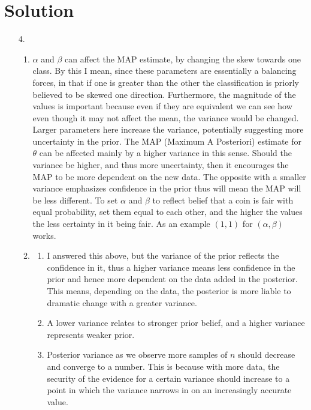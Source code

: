\documentclass[submit]{harvardml}
\newenvironment{answer}
  {\section*{Solution}}
{}
\begin{document}
\begin{answer}
\begin{enumerate}
\begin{enumerate}
      \end{enumerate}

    \item[4.]

      \begin{enumerate}
        \item
        $\alpha$ and $\beta$ can affect the MAP estimate, by changing the skew towards one class. By this I mean, since these parameters are essentially a balancing forces, in that if one is greater than the other the classification is priorly believed to be skewed one direction. Furthermore, the magnitude of the values is important because even if they are equivalent we can see how even though it may not affect the mean, the variance would be changed. Larger parameters here increase the variance, potentially suggesting more uncertainty in the prior. The MAP (Maximum A Posteriori) estimate for $\theta$ can be affected mainly by a higher variance in this sense. Should the variance be higher, and thus more uncertainty, then it encourages the MAP to be more dependent on the new data. The opposite with a smaller variance emphasizes confidence in the prior thus will mean the MAP will be less different. To set $\alpha$ and $\beta$ to reflect belief that a coin is fair with equal probability, set them equal to each other, and the higher the values the less certainty in it being fair. As an example $(1,1)$ for $(\alpha, \beta)$ works. 
        \item
              \begin{enumerate}
                \item
                I answered this above, but the variance of the prior reflects the confidence in it, thus a higher variance means less confidence in the prior and hence more dependent on the data added in the posterior. This means, depending on the data, the posterior is more liable to dramatic change with a greater variance. 
                \item
                A lower variance relates to stronger prior belief, and a higher variance represents weaker prior. 
                \item
                Posterior variance as we observe more samples of $n$ should decrease and converge to a number. This is because with more data, the security of the evidence for a certain variance should increase to a point in which the variance narrows in on an increasingly accurate value.
              \end{enumerate}


\end{enumerate}
\end{enumerate}
\end{answer}
\end{document}
